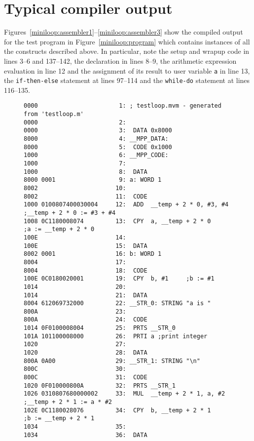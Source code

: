 \section{Typical compiler output}
\label{miniloop:assembler}
Figures~\ref{miniloop:assembler1}--\ref{miniloop:assembler3} show the compiled output for
the test program in Figure~\ref{miniloop:program} which contains instances of all the constructs
described above. In particular, note the setup and wrapup code in lines 3--6 and 137--142,
the declaration in lines 8--9, the arithmetic expression evaluation in line 12 and the assignment
of its result to user variable {\tt a} in line 13, the {\tt if-then-else} statement at 
lines 97--114 and the {\tt while-do} statement at lines 116--135.
\begin{figure}
\hspace*{-1cm}
\begin{minipage}{30cm}
\footnotesize
\begin{verbatim}
0000                       1: ; testloop.mvm - generated from 'testloop.m'
0000                       2: 
0000                       3:  DATA 0x8000
8000                       4: __MPP_DATA:
8000                       5:  CODE 0x1000
1000                       6: __MPP_CODE:
1000                       7:  
1000                       8:  DATA
8000 0001                  9: a: WORD 1
8002                      10: 
8002                      11:  CODE
1000 0100807400030004     12:  ADD  __temp + 2 * 0, #3, #4    ;__temp + 2 * 0 := #3 + #4
1008 0C1180008074         13:  CPY  a, __temp + 2 * 0         ;a := __temp + 2 * 0 
100E                      14:  
100E                      15:  DATA
8002 0001                 16: b: WORD 1
8004                      17: 
8004                      18:  CODE
100E 0C0180020001         19:  CPY  b, #1     ;b := #1 
1014                      20: 
1014                      21:  DATA
8004 612069732000         22: __STR_0: STRING "a is "
800A                      23: 
800A                      24:  CODE
1014 0F0100008004         25:  PRTS __STR_0
101A 101100008000         26:  PRTI a ;print integer
1020                      27: 
1020                      28:  DATA
800A 0A00                 29: __STR_1: STRING "\n"
800C                      30: 
800C                      31:  CODE
1020 0F010000800A         32:  PRTS __STR_1
1026 0310807680000002     33:  MUL  __temp + 2 * 1, a, #2     ;__temp + 2 * 1 := a * #2
102E 0C1180028076         34:  CPY  b, __temp + 2 * 1         ;b := __temp + 2 * 1 
1034                      35: 
1034                      36:  DATA

\end{verbatim}
\end{minipage}
\end{figure}
